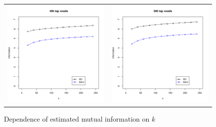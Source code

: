 \begin{figure}
\begin{tabular}{cc}
\includegraphics[scale = 0.4]{../../Yuval/ident_infer4.pdf} &
\includegraphics[scale = 0.4]{../../Yuval/ident_infer5.pdf}
\end{tabular}
\caption{Dependence of estimated mutual information on $k$}
\label{fig:dependence_k}
\end{figure}


